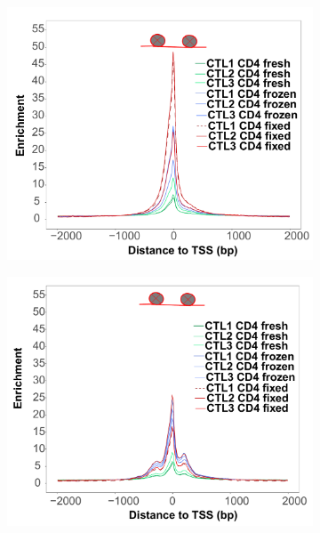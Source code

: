 \begin{figure}[H]
\begin{subfigure}[b]{0.45\textwidth}
\end{subfigure}
~
\begin{subfigure}[b]{0.45\textwidth} 
\centering
\includegraphics[width=\textwidth]{./Results1/pdfs/Core_ATAC_CD4_fresh_frozen_fixed_internucleosome_TSS}%
\caption{}
\end{subfigure}
\begin{subfigure}[b]{0.45\textwidth} 
\centering
\includegraphics[width=\textwidth]{./Results1/pdfs/Core_ATAC_CD4_fresh_frozen_fixed_dinucleosome_TSS}%

\end{subfigure}
\end{figure}
